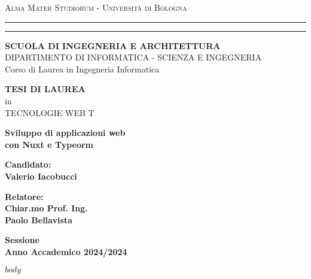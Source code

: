 \documentclass[12pt,a4paper]{report}
\begin{document}
\begin{titlepage}
	\begin{center}
	{{\Large{\textsc{Alma Mater Studiorum - Universit\`a di
	Bologna}}}} \rule[0.1cm]{15.8cm}{0.1mm}
	\rule[0.5cm]{15.8cm}{0.6mm}
	{\small{\bf SCUOLA DI INGEGNERIA E ARCHITETTURA}\\
	DIPARTIMENTO DI INFORMATICA - SCIENZA E INGEGNERIA\\
	Corso di Laurea in Ingegneria Informatica}
	\end{center}
	\vspace{15mm}
	\begin{center}
	{\large{\bf TESI DI LAUREA}}\\
	\vspace{2mm}
	{\large{in}}\\
	\vspace{2mm}
	{\large{TECNOLOGIE WEB T}}\\
	\end{center}
	\vspace{15mm}
	\begin{center}
	{\LARGE{\bf Sviluppo di applicazioni web}}\\
	\vspace{3mm}
	{\LARGE{\bf con Nuxt e Typeorm}}\\
	\end{center}
	\vspace{40mm}
	\par
	\noindent
	\begin{minipage}[t]{0.47\textwidth}
	{\large{\bf Candidato:\\
	Valerio Iacobucci}}
	\end{minipage}
	\hfill
	\begin{minipage}[t]{0.47\textwidth}\raggedleft
	{\large{\bf Relatore:\\
	Chiar.mo Prof. Ing.\\
	Paolo Bellavista}}
	\end{minipage}
	\vspace{20mm}
	\begin{center}
	{\large{\bf Sessione\\
	Anno Accademico 2024/2024 }}
	\end{center}
\end{titlepage}

\shipout\null


\tableofcontents
\newpage

$body$
\end{document}
